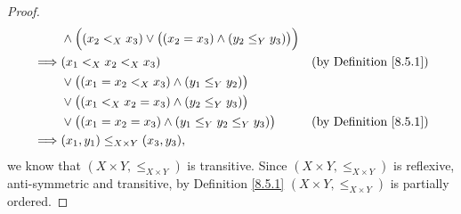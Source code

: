 \begin{proof}
\begin{align*}
                 & \land \Big((x_2 <_X x_3) \lor \big((x_2 = x_3) \land (y_2 \leq_Y y_3)\big)\Big)                                                                \\
        \implies & (x_1 <_X x_2 <_X x_3)                                                                                     & \text{(by Definition \ref{8.5.1})} \\
                 & \lor \big((x_1 = x_2 <_X x_3) \land (y_1 \leq_Y y_2)\big)                                                                                      \\
                 & \lor \big((x_1 <_X x_2 = x_3) \land (y_2 \leq_Y y_3)\big)                                                                                      \\
                 & \lor \big((x_1 = x_2 = x_3) \land (y_1 \leq_Y y_2 \leq_Y y_3)\big)                                        & \text{(by Definition \ref{8.5.1})} \\
        \implies & (x_1, y_1) \leq_{X \times Y} (x_3, y_3),
    \end{align*}
    we know that \((X \times Y, \leq_{X \times Y})\) is transitive.
    Since \((X \times Y, \leq_{X \times Y})\) is reflexive, anti-symmetric and transitive, by Definition \ref{8.5.1} \((X \times Y, \leq_{X \times Y})\) is partially ordered.


\end{proof}
